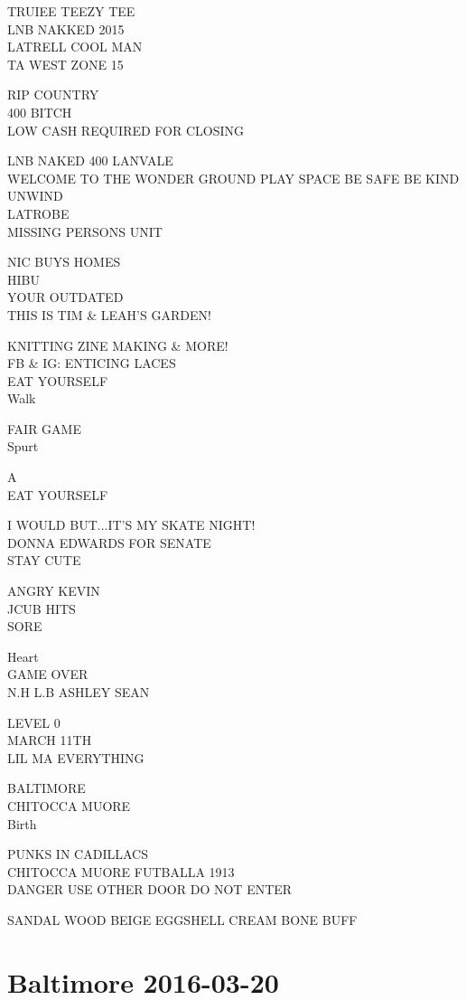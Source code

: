 \documentclass[10pt,letterpaper]{article}
\begin{document}
TRUIEE TEEZY TEE\\
LNB NAKKED 2015\\
LATRELL COOL MAN\\
TA WEST ZONE 15

RIP COUNTRY\\
400 BITCH\\
LOW CASH REQUIRED FOR CLOSING

LNB NAKED 400 LANVALE\\
WELCOME TO THE WONDER GROUND PLAY SPACE BE SAFE BE KIND UNWIND\\
LATROBE\\
MISSING PERSONS UNIT

NIC BUYS HOMES\\
HIBU\\
YOUR OUTDATED\\
THIS IS TIM \& LEAH'S GARDEN!

KNITTING ZINE MAKING \& MORE!\\
FB \& IG: ENTICING LACES\\
EAT YOURSELF\\
Walk

FAIR GAME\\
Spurt

A\\
EAT YOURSELF

I WOULD BUT...IT'S MY SKATE NIGHT!\\
DONNA EDWARDS FOR SENATE\\
STAY CUTE

ANGRY KEVIN\\
JCUB HITS\\
SORE

Heart\\
GAME OVER\\
N.H L.B ASHLEY SEAN

LEVEL 0\\
MARCH 11TH\\
LIL MA EVERYTHING

BALTIMORE\\
CHITOCCA MUORE\\
Birth

PUNKS IN CADILLACS\\
CHITOCCA MUORE FUTBALLA 1913\\
DANGER USE OTHER DOOR DO NOT ENTER

SANDAL WOOD BEIGE EGGSHELL CREAM BONE BUFF
\pagebreak

\section*{Baltimore 2016-03-20}
\end{document}
